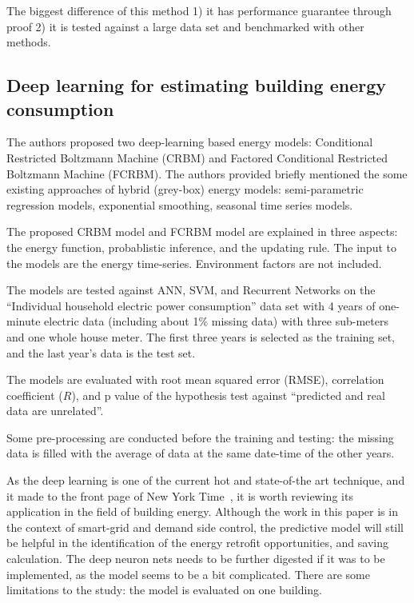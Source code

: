\documentclass[12pt]{article}
\begin{document}
The biggest difference of this method 1) it has performance guarantee
through proof 2) it is tested against a large data set and benchmarked
with other methods.
\subsection{Deep learning for estimating building energy
  consumption~\cite{mocanu2016deep}}
The authors proposed two deep-learning based energy models:
Conditional Restricted Boltzmann Machine (CRBM) and Factored
Conditional Restricted Boltzmann Machine (FCRBM). The authors provided
briefly mentioned the some existing approaches of hybrid (grey-box)
energy models: semi-parametric regression models, exponential
smoothing, seasonal time series models.

The proposed CRBM model and FCRBM model are explained in three aspects:
the energy function, probablistic inference, and the updating
rule. The input to the models are the energy time-series. Environment
factors are not included.

The models are tested against ANN, SVM, and Recurrent Networks on the
``Individual household electric power consumption'' data set with 4
years of one-minute electric data (including about 1\% missing data)
with three sub-meters and one whole house meter. The first three years
is selected as the training set, and the last year's data is the test
set.

The models are evaluated with root mean squared error (RMSE),
correlation coefficient ($R$), and p value of the hypothesis test
against ``predicted and real data are unrelated''.

Some pre-processing are conducted before the training and testing: the
missing data is filled with the average of data at the same date-time
of the other years.

As the deep learning is one of the current hot and state-of-the art
technique, and it made to the front page of New York
Time~\cite{mgormley2016}, it is worth reviewing its application in the
field of building energy. Although the work in this paper is in the
context of smart-grid and demand side control, the predictive model
will still be helpful in the identification of the energy retrofit
opportunities, and saving calculation. The deep neuron nets needs to
be further digested if it was to be implemented, as the model seems to
be a bit complicated. There are some limitations to the study: the
model is evaluated on one building.
\end{document}

